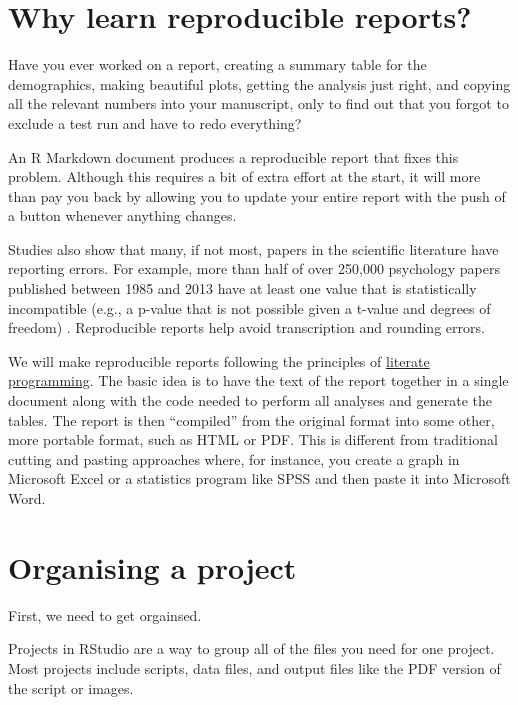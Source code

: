 \documentclass[
  oneside]{book}
\begin{document}
\hypertarget{why-learn-reproducible-reports}{%
\section{Why learn reproducible reports?}\label{why-learn-reproducible-reports}}

Have you ever worked on a report, creating a summary table for the demographics, making beautiful plots, getting the analysis just right, and copying all the relevant numbers into your manuscript, only to find out that you forgot to exclude a test run and have to redo everything?

An R Markdown document produces a reproducible report that fixes this problem. Although this requires a bit of extra effort at the start, it will more than pay you back by allowing you to update your entire report with the push of a button whenever anything changes.

Studies also show that many, if not most, papers in the scientific literature have reporting errors. For example, more than half of over 250,000 psychology papers published between 1985 and 2013 have at least one value that is statistically incompatible (e.g., a p-value that is not possible given a t-value and degrees of freedom) \citep{nuijten2016prevalence}. Reproducible reports help avoid transcription and rounding errors.

We will make reproducible reports following the principles of \href{https://en.wikipedia.org/wiki/Literate_programming}{literate programming}. The basic idea is to have the text of the report together in a single document along with the code needed to perform all analyses and generate the tables. The report is then ``compiled'' from the original format into some other, more portable format, such as HTML or PDF. This is different from traditional cutting and pasting approaches where, for instance, you create a graph in Microsoft Excel or a statistics program like SPSS and then paste it into Microsoft Word.

\hypertarget{projects}{%
\section{Organising a project}\label{projects}}

First, we need to get orgainsed.

Projects in RStudio are a way to group all of the files you need for one project. Most projects include scripts, data files, and output files like the PDF version of the script or images.
\end{document}

